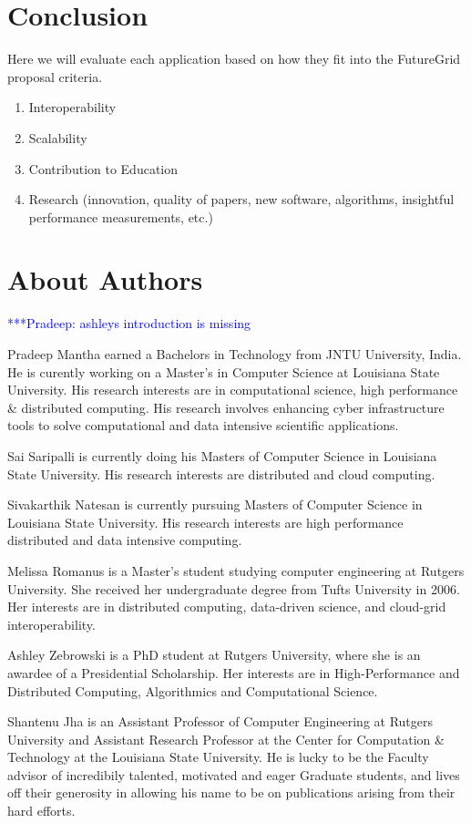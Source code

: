 \documentclass[]{paper}
\newcommand{\pmnote}[1]{ {\textcolor{blue} { ***Pradeep: #1 }}}
\newcommand{\pmnote}[1]{}
\begin{document}
\section{Conclusion}
Here we will evaluate each application based on how they fit into the
FutureGrid proposal criteria.
\begin{enumerate}
\item Interoperability
\item Scalability
\item Contribution to Education
\item Research (innovation, quality of papers, new software, algorithms, insightful performance measurements, etc.)
\end{enumerate}


\section{About Authors} 

\pmnote{ashleys introduction is missing}

Pradeep Mantha earned a Bachelors in Technology from JNTU University, India. He is curently working on a Master's in Computer Science at
Louisiana State University. His research interests are in computational science, high performance \& distributed computing. His research involves enhancing
cyber infrastructure tools to solve computational and data intensive scientific applications.

Sai Saripalli is currently doing his Masters of Computer Science in Louisiana State University. His research interests are distributed and cloud computing. 

Sivakarthik Natesan is currently pursuing Masters of Computer Science in Louisiana State University. His research interests are high performance distributed and data intensive computing.

Melissa Romanus is a Master's student studying computer engineering at Rutgers University. She received her undergraduate degree from Tufts University in 2006. Her interests are in distributed computing, data-driven science, and cloud-grid interoperability.

Ashley Zebrowski is a PhD student at Rutgers University, where she is an awardee of a Presidential Scholarship. Her interests are in High-Performance and Distributed Computing, Algorithmics and Computational Science.

Shantenu Jha is an Assistant Professor of Computer Engineering at Rutgers University and Assistant Research Professor at the Center for Computation \& Technology at the Louisiana State University. He is lucky to be the Faculty advisor of incredibily talented, motivated and eager Graduate students, and lives off their generosity in allowing his name to be on publications arising from their hard efforts.
\end{document}
